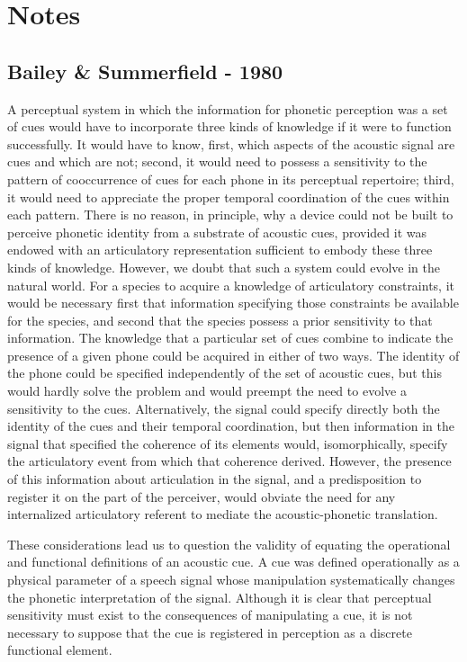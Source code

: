 \section{Notes}

\subsection{Bailey \& Summerfield - 1980}
\label{note:cues}

A perceptual system in which the information for phonetic perception was a set of cues would have to incorporate three kinds of knowledge if it were to function successfully. It would have to know, first, which aspects of the acoustic signal are cues and which are not; second, it would need to possess a sensitivity to the pattern of cooccurrence of cues for each phone in its perceptual repertoire; third, it would need to appreciate the proper temporal coordination of the cues within each pattern. There is no reason, in principle, why a device could not be built to perceive phonetic identity from a substrate of acoustic cues, provided it was endowed with an articulatory representation sufficient to embody these three kinds of knowledge. However, we doubt that such a system could evolve in the natural world. For a species to acquire a knowledge of articulatory constraints, it would be necessary first that information specifying those constraints be available for the species, and second that the species possess a prior sensitivity to that information. The knowledge that a particular set of cues combine to indicate the presence of a given phone could be acquired in either of two ways. The identity of the phone could be specified independently of the set of acoustic cues, but this would hardly solve the problem and would preempt the need to evolve a sensitivity to the cues. Alternatively, the signal could specify directly both the identity of the cues and their temporal coordination, but then information in the signal that specified the coherence of its elements would, isomorphically, specify the articulatory event from which that coherence derived. However, the presence of this information about articulation in the signal, and a predisposition to register it on the part of the perceiver, would obviate the need for any internalized articulatory referent to mediate the acoustic-phonetic translation.

These considerations lead us to question the validity of equating the operational and functional definitions of an acoustic cue. A cue was defined operationally as a physical parameter of a speech signal whose manipulation systematically changes the phonetic interpretation of the signal. Although it is clear that perceptual sensitivity must exist to the consequences of manipulating a cue, it is not necessary to suppose that the cue is registered in perception as a discrete functional element.\cite{Bailey1980}

